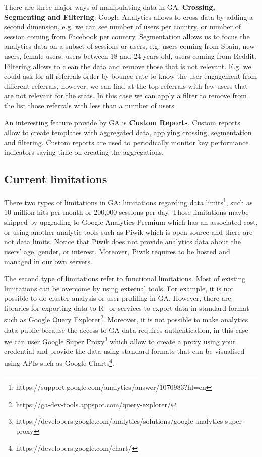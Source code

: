 \documentclass{article}
\begin{document}
 
There are three major ways of manipulating data in GA: \textbf{Crossing, Segmenting and Filtering}. Google Analytics allows to cross data by adding a second dimension, e.g. we can see number of users per country, or number of session coming from Facebook per country. Segmentation allows us to focus the analytics data on a subset of sessions or users, e.g. users coming from Spain, new users, female users, users between 18 and 24 years old, users coming from Reddit. Filtering allows to clean the data and remove those that is not relevant. E.g. we could ask for all referrals order by bounce rate to know the user engagement from different referrals, however, we can find at the top referrals with few users that are not relevant for the stats. In this case we can apply a filter to remove from the list those referrals with less than a number of users. 



An interesting feature provide by GA is \textbf{Custom Reports}. Custom reports allow to create templates with aggregated data, applying crossing, segmentation and filtering. Custom reports are used to periodically monitor key performance indicators saving time on creating the aggregations. 


\subsection{Current limitations}

There two types of limitations in GA: limitations regarding data limits\footnote{https://support.google.com/analytics/answer/1070983?hl=en}, such as 10 million hits per month or 200,000 sessions per day. Those limitations maybe skipped by upgrading to Google Analytics Premium which has an associated cost, or using another analytic tools such as Piwik which is open source and there are not data limits. Notice that Piwik does not provide analytics data about the users' age, gender, or interest. Moreover, Piwik requires to be hosted and managed in our own servers. 

The second type of limitations refer to functional limitations. Most of existing limitations can be overcome by using external tools. For example, it is not possible to do cluster analysis or user profiling in GA. However, there are libraries for exporting data to R~\cite{} or services to export data in standard format such as Google Query Explorer\footnote{https://ga-dev-tools.appspot.com/query-explorer/}. Moreover, it is not possible to make analytics data public because the access to GA data requires authentication, in this case we can user Google Super Proxy\footnote{https://developers.google.com/analytics/solutions/google-analytics-super-proxy} which allow to create a proxy using your credential and provide the data using standard formats that can be visualised using APIs such as Google Charts\footnote{https://developers.google.com/chart/}.
\end{document}
